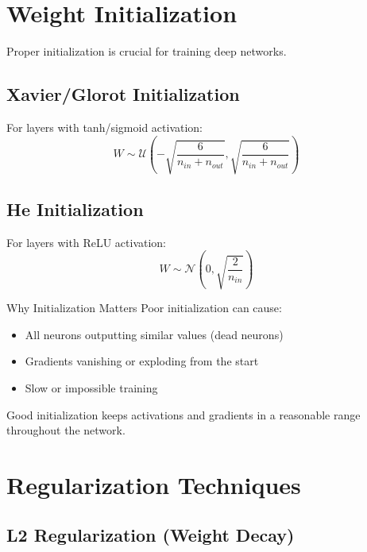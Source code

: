 \section{Weight Initialization}

Proper initialization is crucial for training deep networks.

\subsection{Xavier/Glorot Initialization}

For layers with tanh/sigmoid activation:
\[
W \sim \mathcal{U}\left(-\sqrt{\frac{6}{n_{in} + n_{out}}}, \sqrt{\frac{6}{n_{in} + n_{out}}}\right)
\]

\subsection{He Initialization}

For layers with ReLU activation:
\[
W \sim \mathcal{N}\left(0, \sqrt{\frac{2}{n_{in}}}\right)
\]

\begin{infobox}{Why Initialization Matters}
Poor initialization can cause:
\begin{itemize}
    \item All neurons outputting similar values (dead neurons)
    \item Gradients vanishing or exploding from the start
    \item Slow or impossible training
\end{itemize}
Good initialization keeps activations and gradients in a reasonable range throughout the network.
\end{infobox}

\section{Regularization Techniques}

\subsection{L2 Regularization (Weight Decay)}

